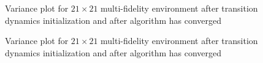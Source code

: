 \documentclass[12pt]{report}
\begin{document}
\begin{figure}
	\centering
	\caption{Variance plot for $21 \times 21$ multi-fidelity environment after transition dynamics initialization and after algorithm has converged}
   \label{fig:heatmap1}
\end{figure}

\begin{figure}[htp]
	\centering 
	\caption{Variance plot for $21 \times 21$ multi-fidelity environment after transition dynamics initialization and after algorithm has converged}
   \label{fig:heatmap2}
\end{figure}
\end{document}
